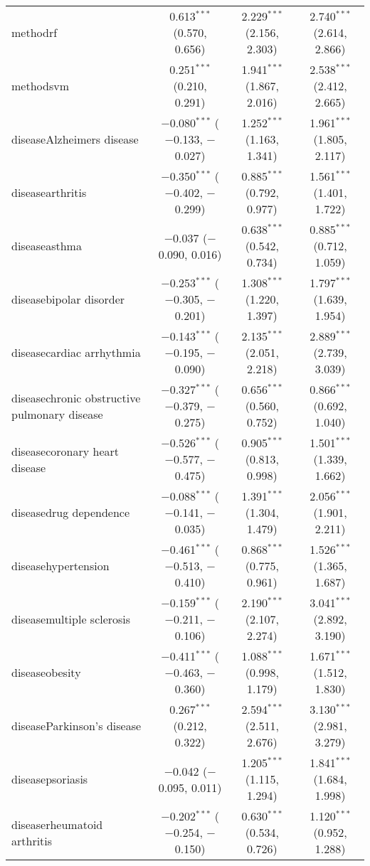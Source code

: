 \begin{table}[!htbp]
\begin{tabular}{@{\extracolsep{5pt}}lccc}
  methodrf & 0.613$^{***}$ (0.570, 0.656) & 2.229$^{***}$ (2.156, 2.303) & 2.740$^{***}$ (2.614, 2.866) \\ 
  methodsvm & 0.251$^{***}$ (0.210, 0.291) & 1.941$^{***}$ (1.867, 2.016) & 2.538$^{***}$ (2.412, 2.665) \\ 
  diseaseAlzheimers disease & $-$0.080$^{***}$ ($-$0.133, $-$0.027) & 1.252$^{***}$ (1.163, 1.341) & 1.961$^{***}$ (1.805, 2.117) \\ 
  diseasearthritis & $-$0.350$^{***}$ ($-$0.402, $-$0.299) & 0.885$^{***}$ (0.792, 0.977) & 1.561$^{***}$ (1.401, 1.722) \\ 
  diseaseasthma & $-$0.037 ($-$0.090, 0.016) & 0.638$^{***}$ (0.542, 0.734) & 0.885$^{***}$ (0.712, 1.059) \\ 
  diseasebipolar disorder & $-$0.253$^{***}$ ($-$0.305, $-$0.201) & 1.308$^{***}$ (1.220, 1.397) & 1.797$^{***}$ (1.639, 1.954) \\ 
  diseasecardiac arrhythmia & $-$0.143$^{***}$ ($-$0.195, $-$0.090) & 2.135$^{***}$ (2.051, 2.218) & 2.889$^{***}$ (2.739, 3.039) \\ 
  diseasechronic obstructive pulmonary disease & $-$0.327$^{***}$ ($-$0.379, $-$0.275) & 0.656$^{***}$ (0.560, 0.752) & 0.866$^{***}$ (0.692, 1.040) \\ 
  diseasecoronary heart disease & $-$0.526$^{***}$ ($-$0.577, $-$0.475) & 0.905$^{***}$ (0.813, 0.998) & 1.501$^{***}$ (1.339, 1.662) \\ 
  diseasedrug dependence & $-$0.088$^{***}$ ($-$0.141, $-$0.035) & 1.391$^{***}$ (1.304, 1.479) & 2.056$^{***}$ (1.901, 2.211) \\ 
  diseasehypertension & $-$0.461$^{***}$ ($-$0.513, $-$0.410) & 0.868$^{***}$ (0.775, 0.961) & 1.526$^{***}$ (1.365, 1.687) \\ 
  diseasemultiple sclerosis & $-$0.159$^{***}$ ($-$0.211, $-$0.106) & 2.190$^{***}$ (2.107, 2.274) & 3.041$^{***}$ (2.892, 3.190) \\ 
  diseaseobesity & $-$0.411$^{***}$ ($-$0.463, $-$0.360) & 1.088$^{***}$ (0.998, 1.179) & 1.671$^{***}$ (1.512, 1.830) \\ 
  diseaseParkinson's disease & 0.267$^{***}$ (0.212, 0.322) & 2.594$^{***}$ (2.511, 2.676) & 3.130$^{***}$ (2.981, 3.279) \\ 
  diseasepsoriasis & $-$0.042 ($-$0.095, 0.011) & 1.205$^{***}$ (1.115, 1.294) & 1.841$^{***}$ (1.684, 1.998) \\ 
  diseaserheumatoid arthritis & $-$0.202$^{***}$ ($-$0.254, $-$0.150) & 0.630$^{***}$ (0.534, 0.726) & 1.120$^{***}$ (0.952, 1.288) \\ 

\end{tabular}
\end{table}
